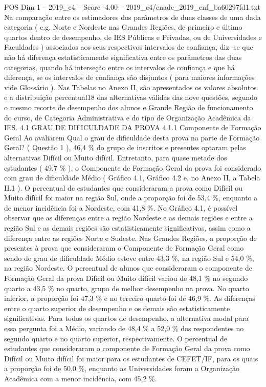 \begin{textsample}{POS Dim 1 – 2019\_c4 – Score -4.00 – 2019\_c4/enade\_2019\_enf\_ba60297fd1.txt}
Na comparação entre os estimadores dos parâmetros de duas classes de uma dada categoria ( e.g.
Norte e Nordeste nas Grandes Regiões, de primeiro e último quartos dentro de desempenho, de IES Públicas e Privadas, ou de Universidades e Faculdades ) associados aos seus respectivos intervalos de confiança, diz -se que não há diferença estatisticamente significativa entre os parâmetros das duas categorias, quando há interseção entre os intervalos de confiança e que há diferença, se os intervalos de confiança são disjuntos ( para maiores informações vide Glossário ).
Nas Tabelas no Anexo II, são apresentados os valores absolutos e a distribuição percentual18 das alternativas válidas das nove questões, segundo o mesmo recorte de desempenho dos alunos e Grande Região de funcionamento do curso, de Categoria Administrativa e do tipo de Organização Acadêmica da IES. 4.1 GRAU DE DIFICULDADE DA PROVA 4.1.1 Componente de Formação Geral Ao avaliarem Qual o grau de dificuldade desta prova na parte de Formação Geral? ( Questão 1 ), 46,4 \% do grupo de inscritos e presentes optaram pelas alternativas Difícil ou Muito difícil.
Entretanto, para quase metade dos estudantes ( 49,7 \% ), o Componente de Formação Geral da prova foi considerado com grau de dificuldade Médio ( Gráfico 4.1, Gráfico 4.2 e, no Anexo II, a Tabela II.1 ).
O percentual de estudantes que consideraram a prova como Difícil ou Muito difícil foi maior na região Sul, onde a proporção foi de 53,4 \%, enquanto a de menor incidência foi a Nordeste, com 41,8 \%.
No Gráfico 4.1, é possível observar que as diferenças entre a região Nordeste e as demais regiões e entre a região Sul e as demais regiões são estatisticamente significativas, assim como a diferença entre as regiões Norte e Sudeste.
Nas Grandes Regiões, a proporção de presentes à prova que consideraram o Componente de Formação Geral como sendo de grau de dificuldade Médio esteve entre 43,3 \%, na região Sul e 54,0 \%, na região Nordeste.
O percentual de alunos que consideraram o componente de Formação Geral da prova Difícil ou Muito difícil variou de 48,1 \% no segundo quarto a 43,5 \% no quarto, grupo de melhor desempenho na prova.
No quarto inferior, a proporção foi 47,3 \% e no terceiro quarto foi de 46,9 \%.
As diferenças entre o quarto superior de desempenho e os demais são estatisticamente significativas.
Para todos os quartos de desempenho, a alternativa modal para essa pergunta foi a Médio, variando de 48,4 \% a 52,0 \% dos respondentes no segundo quarto e no quarto superior, respectivamente.
O percentual de estudantes que consideraram o componente de Formação Geral da prova como Difícil ou Muito difícil foi maior para os estudantes de CEFET/IF, para os quais a proporção foi de 50,0 \%, enquanto as Universidades foram a Organização Acadêmica com a menor incidência, com 45,2 \%.

\end{textsample}
